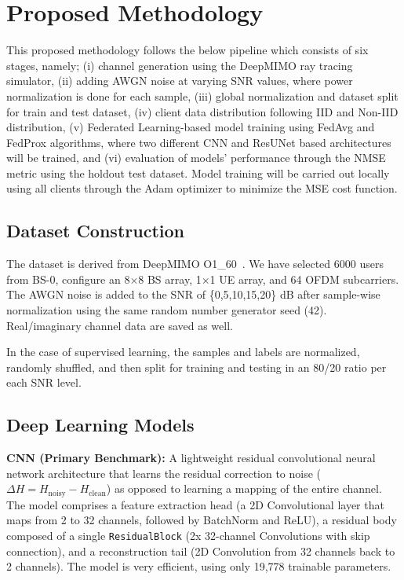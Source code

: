 \documentclass[runningheads]{llncs}
\begin{document}
\section{Proposed Methodology}
This proposed methodology follows the below pipeline which consists of six stages, namely; (i) channel generation using the DeepMIMO ray tracing simulator, (ii) adding AWGN noise at varying SNR values, where power normalization is done for each sample, (iii) global normalization and dataset split for train and test dataset, (iv) client data distribution following IID and Non-IID distribution, (v) Federated Learning-based model training using FedAvg and FedProx algorithms, where two different CNN and ResUNet based architectures will be trained, and (vi) evaluation of models' performance through the NMSE metric using the holdout test dataset. Model training will be carried out locally using all clients through the Adam optimizer to minimize the MSE cost function.

\subsection{Dataset Construction}
The dataset is derived from DeepMIMO O1\_60~\cite{alkhateeb2019deepmimo}. We have selected 6000 users from BS-0, configure an 8$\times$8 BS array, 1$\times$1 UE array, and 64 OFDM subcarriers. The AWGN noise is added to the SNR of \{0,5,10,15,20\} dB after sample-wise normalization using the same random number generator seed (42). Real/imaginary channel data are saved as well.

In the case of supervised learning, the samples and labels are normalized, randomly shuffled, and then split for training and testing in an 80/20 ratio per each SNR level.

\subsection{Deep Learning Models}
\textbf{CNN (Primary Benchmark):} A lightweight residual convolutional neural network architecture that learns the residual correction to noise ($\Delta H = H_{\text{noisy}} - H_{\text{clean}}$) as opposed to learning a mapping of the entire channel. The model comprises a feature extraction head (a 2D Convolutional layer that maps from 2 to 32 channels,
followed by BatchNorm and ReLU), a residual body composed of a single \texttt{ResidualBlock} (2x 32-channel Convolutions with skip connection), and a reconstruction tail (2D Convolution from 32 channels back to 2 channels). The model is very efficient, using only 19,778 trainable parameters.
\end{document}
